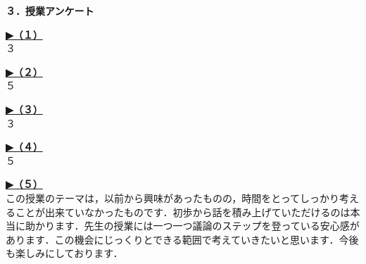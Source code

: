 \documentclass[b5j,dvipdfmx,uplatex]{jsarticle}
\begin{document}
\medskip
{
 \begin{tcolorbox}[enhanced,frame code={
   \foreach \n in {north east,north west,south east,south west}
   {\path [fill=black!75!black] (interior.\n) circle (2mm); }; }]
  \Large \bf ３．授業アンケート
 \end{tcolorbox}}
\medskip

\noindent
\underline{\large \bf ▶（１）}
\\
\indent
３

\noindent
\underline{\large \bf ▶（２）}
\\
\indent
５

\noindent
\underline{\large \bf ▶（３）}
\\
\indent
３

\noindent
\underline{\large \bf ▶（４）}
\\
\indent
５

\noindent
\underline{\large \bf ▶（５）}
\\
\indent
この授業のテーマは，以前から興味があったものの，時間をとってしっかり考えることが出来ていなかったものです．初歩から話を積み上げていただけるのは本当に助かります．先生の授業には一つ一つ議論のステップを登っている安心感があります．この機会にじっくりとできる範囲で考えていきたいと思います．今後も楽しみにしております．
\end{document}
